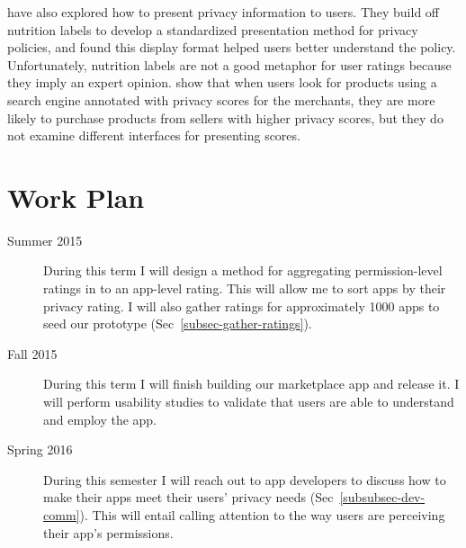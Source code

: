 \documentclass[11pt]{article}
\begin{document}
\citet{nutrition-labels-SOUPS09} have also explored how to 
present privacy information to users.
They build off nutrition labels to develop a standardized 
presentation method for privacy policies, and found this 
display format helped users better understand the policy. 
Unfortunately, nutrition labels are not a good 
metaphor for user ratings because they imply an expert 
opinion. \citet{privacy-purchasing-effect-INFORMS11} 
show that when users look for products using a search engine 
annotated with privacy scores for the merchants, they are more 
likely to purchase products from sellers with higher privacy scores,
but they do not examine different interfaces for presenting
scores.


\section{Work Plan}

\begin{description}

\item[Summer 2015]
During this term I will design a method for aggregating 
permission-level ratings in to an app-level rating. 
This will allow me to sort apps by their privacy rating.
I will also gather ratings for approximately 1000 apps 
to seed our prototype (Sec~\ref{subsec-gather-ratings}).


\item[Fall 2015]
During this term I will finish building our marketplace 
app and release it. I will perform usability studies to
validate that users are able to understand and employ
the app.

\item[Spring 2016] 
During this semester I will reach out to app developers to discuss
how to make their apps meet their users' privacy needs 
(Sec~\ref{subsubsec-dev-comm}). This will entail
calling attention to the way users are perceiving their app's
permissions.

\end{description}

\singlespacing
\end{document}
